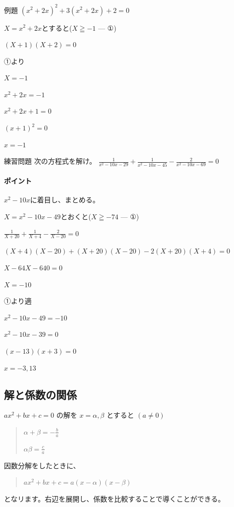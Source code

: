 \documentclass[uplatex,fleqn]{jsbook}
\begin{document}
\begin{problem}{例題}
    $\left(x^2+2x\right)^2+3\left(x^2+2x\right)+2=0$

    $X=x^2+2x$とすると($X\geqq-1$ --- ①)

    $\left(X+1\right)\left(X+2\right)=0$

    ①より

    $X=-1$

    $x^2+2x=-1$

    $x^2+2x+1=0$

    $\left(x+1\right)^2=0$

    $x=-1$
\end{problem}

\begin{problem}{練習問題}
    次の方程式を解け。
    $\displaystyle \frac{1}{x^2-10x-29}+\frac{1}{x^2-10x-45}-\frac{2}{x^2-10x-69}=0$
\end{problem}

\paragraph{ポイント}$x^2-10x$に着目し、まとめる。


\begin{answer}
    $X=x^2-10x-49$とおくと($X\geqq-74$ --- ①)

    $\displaystyle \frac{1}{X+20}+\frac{1}{X+4}-\frac{2}{X-20}=0$

    $\left(X+4\right)\left(X-20\right)+\left(X+20\right)\left(X-20\right)-2\left(X+20\right)\left(X+4\right)=0$

    $X-64X-640=0$

    $X=-10$

    ①より適

    $x^2-10x-49=-10$

    $x^2-10x-39=0$

    $\left(x-13\right)\left(x+3\right)=0$

    $x=-3,13$
\end{answer}

\subsection{解と係数の関係}

$ax^2+bx+c=0$
の解を
$x=\alpha,\beta$
とすると
$\left(a\neq0\right)$
\begin{quote}
    $\displaystyle \alpha+\beta=-\frac{b}{a}$

    $\displaystyle \alpha\beta=\frac{c}{a}$
\end{quote}
因数分解をしたときに、
\begin{quote}
    $ax^2+bx+c=a\left(x-\alpha\right)\left(x-\beta\right)$
\end{quote}
となリます。右辺を展開し、係数を比較することで導くことができる。
\end{document}

